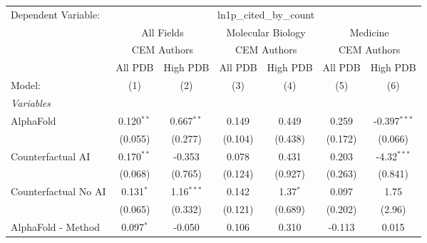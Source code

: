 \begingroup
\centering
\begin{tabular}{lcccccc}
   \tabularnewline \midrule \midrule
   Dependent Variable: & \multicolumn{6}{c}{ln1p\_cited\_by\_count}\\
 & \multicolumn{2}{c}{All Fields} & \multicolumn{2}{c}{Molecular Biology} & \multicolumn{2}{c}{Medicine} \\
\cmidrule(lr){2-3} \cmidrule(lr){4-5} \cmidrule(lr){6-7}
 & \multicolumn{2}{c}{CEM Authors} & \multicolumn{2}{c}{CEM Authors} & \multicolumn{2}{c}{CEM Authors} \\
\cmidrule(lr){2-3} \cmidrule(lr){4-5} \cmidrule(lr){6-7}
 & \multicolumn{1}{c}{All PDB} & \multicolumn{1}{c}{High PDB} & \multicolumn{1}{c}{All PDB} & \multicolumn{1}{c}{High PDB} & \multicolumn{1}{c}{All PDB} & \multicolumn{1}{c}{High PDB} \\
\cmidrule(lr){2-2} \cmidrule(lr){3-3} \cmidrule(lr){4-4} \cmidrule(lr){5-5} \cmidrule(lr){6-6} \cmidrule(lr){7-7}
   Model:                                                     & (1)          & (2)          & (3)            & (4)           & (5)           & (6)\\  
   \midrule
   \emph{Variables}\\
   AlphaFold                                                  & 0.120$^{**}$ & 0.667$^{**}$ & 0.149          & 0.449         & 0.259         & -0.397$^{***}$\\   
                                                              & (0.055)      & (0.277)      & (0.104)        & (0.438)       & (0.172)       & (0.066)\\   
   Counterfactual AI                                          & 0.170$^{**}$ & -0.353       & 0.078          & 0.431         & 0.203         & -4.32$^{***}$\\   
                                                              & (0.068)      & (0.765)      & (0.124)        & (0.927)       & (0.263)       & (0.841)\\   
   Counterfactual No AI                                       & 0.131$^{*}$  & 1.16$^{***}$ & 0.142          & 1.37$^{*}$    & 0.097         & 1.75\\   
                                                              & (0.065)      & (0.332)      & (0.121)        & (0.689)       & (0.202)       & (2.96)\\   
   AlphaFold - Method                                         & 0.097$^{*}$  & -0.050       & 0.106          & 0.310         & -0.113        & 0.015\\   

\end{tabular}
